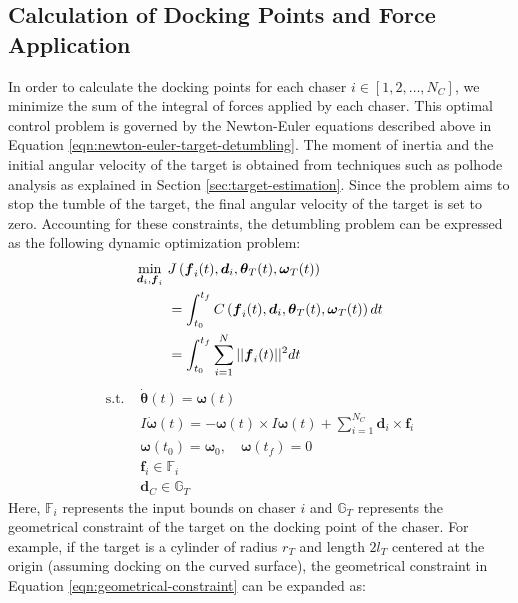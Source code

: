 \subsection{Calculation of Docking Points and Force Application}
In order to calculate the docking points for each chaser $i\in[1,2,\ldots,N_C]$, we minimize the sum of the integral of forces applied by each chaser. This optimal control problem is governed by the Newton-Euler equations described above in Equation \ref{eqn:newton-euler-target-detumbling}. The moment of inertia and the initial angular velocity of the target is obtained from techniques such as polhode analysis as explained in Section \ref{sec:target-estimation}. Since the problem aims to stop the tumble of the target, the final angular velocity of the target is set to zero. Accounting for these constraints, the detumbling problem can be expressed as the following dynamic optimization problem:
\begin{alignat}{2}
    \min_{\boldsymbol{d}_{i},\boldsymbol{f}_{i}}\ &J\left(\boldsymbol{f}_{i}(t),\boldsymbol{d}_{i},\boldsymbol{\theta}_T(t), \boldsymbol{\omega}_T(t)\right)\\
    & =\int_{t_0}^{t_f} C\left(\boldsymbol{f}_{i}(t),\boldsymbol{d}_{i}, \boldsymbol{\theta}_T(t), \boldsymbol{\omega}_T(t)\right) dt\notag\\
    & =\int_{t_0}^{t_f}\sum_{i=1}^N||\boldsymbol{f}_{i}(t)||^2dt\notag
\end{alignat}
\begin{subequations}
\begin{alignat}{2}
    \textrm{s.t. } & \dot{\boldsymbol{\theta}}(t)=\boldsymbol{\omega}(t)\\
    & I\dot{\boldsymbol{\omega}}(t)=-\boldsymbol{\omega}(t)\times I\boldsymbol{\omega}(t)+\sum_{i=1}^{N_C}\boldsymbol{d}_{i}\times\boldsymbol{f}_{i}\\
    & \boldsymbol{\omega}(t_0)=\boldsymbol{\omega}_0,\quad\boldsymbol{\omega}(t_f)=0\\
    & \boldsymbol{f}_{i}\in{\mathbb{F}}_i\\
    & \boldsymbol{d}_C\in{\mathbb{G}}_T \label{eqn:geometrical-constraint}
\end{alignat}
\end{subequations}
Here, ${\mathbb{F}}_i$ represents the input bounds on chaser $i$ and ${\mathbb{G}}_T$ represents the geometrical constraint of the target on the docking point of the chaser. For example, if the target is a cylinder of radius $r_T$ and length $2l_T$ centered at the origin (assuming docking on the curved surface), the geometrical constraint in Equation \ref{eqn:geometrical-constraint} can be expanded as:
